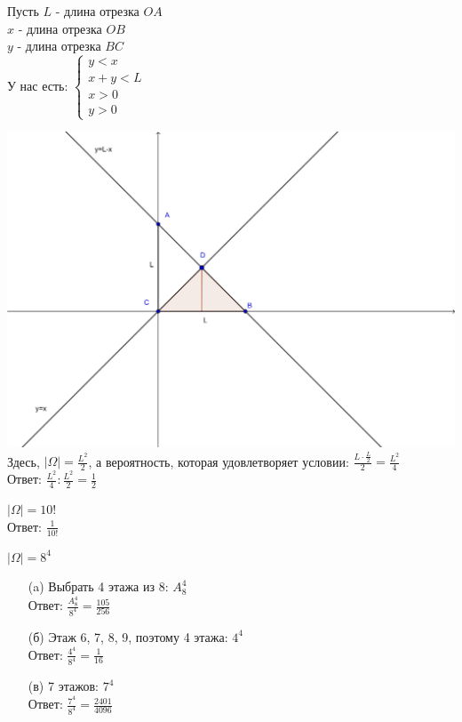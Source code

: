 \begin{exercise}[3]
	
	Пусть $L$ - длина отрезка $OA$ \\ $x$ - длина отрезка $OB$ \\ $y$ - длина отрезка $BC$ \\ У нас есть: $\begin{cases}
		y < x \\ x +y < L \\ x > 0 \\ y > 0
	\end{cases}$
	
	\includegraphics[width=\textwidth]{exercise3-2.png}	
	Здесь, $| \Omega | = \frac{L^2}{2}$, а вероятность, которая удовлетворяет условии: $\frac{L \cdot \frac{L}{2}}{2} = \frac{L^2}{4}$ \\ Ответ: $\frac{L^2}{4} : \frac{L^2}{2} = \frac{1}{2}$
\end{exercise}

\begin{exercise}[4]
	$| \Omega | = 10!$ \\ Ответ: $\frac{1}{10!}$
\end{exercise}

\begin{exercise}[5]
	$| \Omega | = 8^4$
	\begin{enumerate}
		\item [(a)] Выбрать 4 этажа из 8: $A^4_8$ \\ Ответ: $\frac{A^4_8}{8^4} = \frac{105}{256}$
		\item [(б)] Этаж 6, 7, 8, 9, поэтому 4 этажа: $4^4$ \\ Ответ: $\frac{4^4}{8^4} = \frac{1}{16}$
		\item [(в)] 7 этажов: $7^4$ \\ Ответ: $\frac{7^4}{8^4} = \frac{2401}{4096}$
	\end{enumerate}
\end{exercise}

